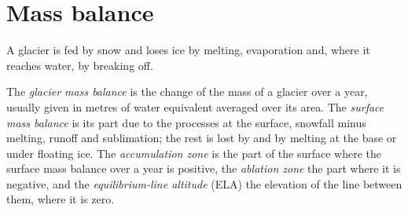 \section{Mass balance}\label{sec:b3:glaciology:mass-balance}

A glacier is fed by snow and loses ice by melting, evaporation and, where it
reaches water, by breaking off.

\begin{definition}\label{def:b3:glaciology:mass-balance}
The \emph{glacier mass balance} is the change
of the mass of a glacier over a year, usually given in metres of water
equivalent averaged over its area. The \emph{surface mass
balance} is its part due to the processes at
the surface, snowfall minus melting, runoff and sublimation; the rest is
lost by  and by melting at the base or under floating ice. The
\emph{accumulation zone} is the part of the
surface where the surface mass balance over a year is positive, the
\emph{ablation zone} the part where it is negative,
and the \emph{equilibrium-line altitude}
(ELA) the elevation of the line between them, where it is zero.
\end{definition}

